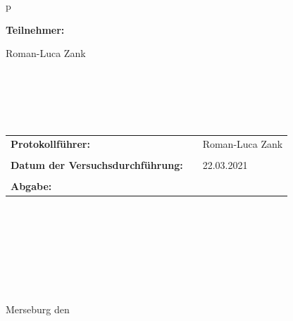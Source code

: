 \begin{center}
\begin{tabular}{p{\textwidth}}
\begin{center}
\Large{\textbf{Teilnehmer:}} \\ 
\end{center}
\begin{center}
\large{Roman-Luca Zank} \\
\end{center}


\\ \\ \\ \\

\begin{center}
\begin{tabular}{lll}
\large{\textbf{Protokollführer:}} & & \large{Roman-Luca Zank}\\
&&\\
\large{\textbf{Datum der Versuchsdurchführung:}}&& \large{22.03.2021}\\
&&\\
\large{\textbf{Abgabe:}}&& \large{\todayDE}
\end{tabular}
\end{center}

\\ \\ \\ \\ \\ \\ \\
\large{Merseburg den \todayDE}

\end{tabular}
\end{center}
